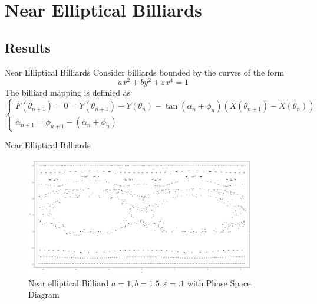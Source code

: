 \documentclass{beamer}
\begin{document}
\section{Near Elliptical Billiards}

\subsection{Results}

\begin{frame}{Near Elliptical Billiards}
    Consider billiards bounded by the curves of the form 
    \begin{equation}        
        a x^2 + b y^2 + \varepsilon x^4 = 1
    \end{equation}
  The billiard mapping is definied as
    \begin{equation}
        \begin{cases} 
          F(\theta_{n+1}) = 0 = Y(\theta_{n+1}) - Y(\theta_n) - \tan(\alpha_n + \phi_n)(X(\theta_{n+1}) - X(\theta_n)) \\
          \alpha_{n+1} = \phi_{n+1} - (\alpha_n + \phi_n)
       \end{cases}
    \end{equation}
\end{frame}

\begin{frame}{Near Elliptical Billiards}
  \begin{figure}
    \centering
    \includegraphics[width = 0.9\textwidth]{NearellipsePhaseSpace4}
    \caption{Near elliptical Billiard $a=1, b=1.5, \varepsilon = .1$ with Phase Space Diagram}
  \end{figure}
\end{frame}
\end{document}
